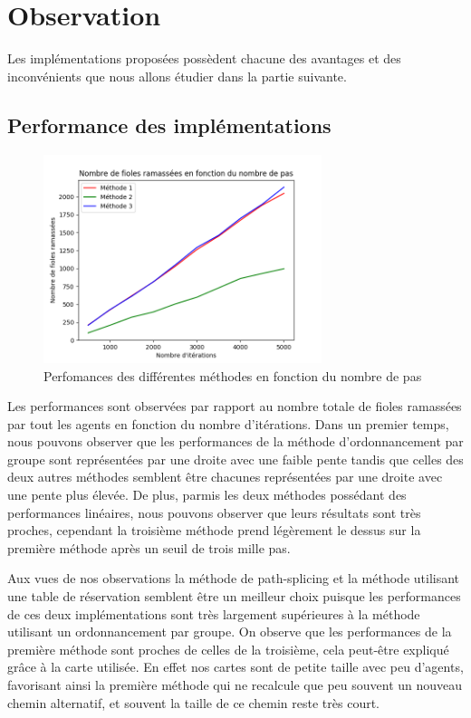 \documentclass[a4paper, twocolumn]{article}
\begin{document}
		\section{Observation}
		
		Les implémentations proposées possèdent chacune des avantages et des inconvénients que nous allons étudier dans la partie suivante.
		
		\subsection{Performance des implémentations}
		
		\begin{figure}[h!]
			\includegraphics[width=3.2in]{compare_methods.png}
			\caption{\textsf{Perfomances des différentes méthodes en fonction du nombre de pas}}
			\label{fig_sim}
		\end{figure}
	
		Les performances sont observées par rapport au nombre totale de fioles ramassées par tout les agents en fonction du nombre d'itérations. Dans un premier temps, nous pouvons observer que les performances de la méthode d'ordonnancement par groupe sont représentées par une droite avec une faible pente tandis que celles des deux autres méthodes semblent être chacunes représentées par une droite avec une pente plus élevée. De plus, parmis les deux méthodes possédant des performances linéaires, nous pouvons observer que leurs résultats sont très proches, cependant la troisième méthode prend légèrement le dessus sur la première méthode après un seuil de trois mille pas.
		
		Aux vues de nos observations la méthode de path-splicing et la méthode utilisant une table de réservation semblent être un meilleur choix puisque les performances de ces deux implémentations sont très largement supérieures à la méthode utilisant un ordonnancement par groupe. On observe que les performances de la première méthode sont proches de celles de la troisième, cela peut-être expliqué grâce à la carte utilisée. En effet nos cartes sont de petite taille avec peu d'agents, favorisant ainsi la première méthode qui ne recalcule que peu souvent un nouveau chemin alternatif, et souvent la taille de ce chemin reste très court.
		
\end{document}
